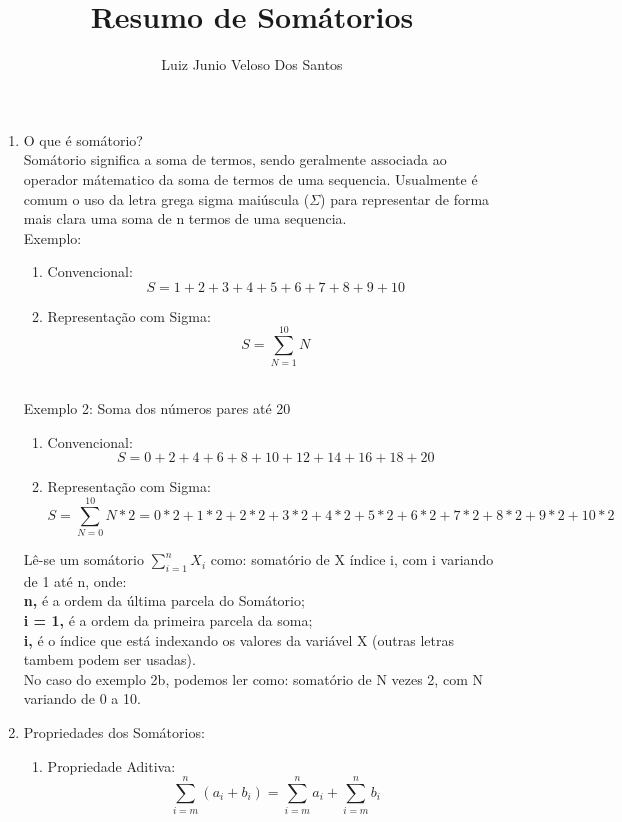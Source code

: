 \documentclass[12pt]{article}
\title{Resumo de Somátorios}
\author{Luiz Junio Veloso Dos Santos}
\begin{document}
 

\maketitle

\begin{enumerate}
    \item O que é somátorio?
    \\
    Somátorio significa a soma de termos, sendo geralmente associada ao operador mátematico da soma de termos
    de uma sequencia. Usualmente é comum o uso da letra grega sigma maiúscula ($\Sigma$) para representar de forma mais clara uma
    soma de n termos de uma sequencia.\\
    Exemplo:
    \begin{enumerate}
        \item Convencional:
            $$S = 1 + 2 + 3 + 4 + 5 + 6 + 7 + 8 + 9 + 10$$
        \item Representação com Sigma:
            $$S = \sum_{N = 1}^{10} N $$
    \end{enumerate}
    ~\\ Exemplo 2: Soma dos números pares até 20
    \begin{enumerate}
        \item Convencional:
            $$ S = 0 + 2 + 4 + 6 + 8 + 10 + 12 + 14 + 16 + 18 + 20 $$
        \item Representação com Sigma:
            $$ 
            S = \sum_{N = 0}^{10} N * 2 = 0*2 + 1*2 + 2*2 + 3*2 + 4*2 + 5*2 + 6*2 + 7*2 + 8*2 + 9*2 + 10*2
            $$
        \end{enumerate}
            Lê-se um somátorio $\sum\limits_{i = 1}^{n} X_i$   como: somatório de X índice i, com i
            variando de 1 até n, onde:\\
            \textbf{n,} é a ordem da última parcela do Somátorio;
            \\
            \textbf{i = 1,} é a ordem da primeira parcela da soma;
            \\
            \textbf{i,} é o índice que está indexando os valores da variável X (outras letras tambem podem
            ser usadas).
            \\
            No caso do exemplo 2b, podemos ler como: somatório de N vezes 2, com N
            variando de 0 a 10.
            \vspace{4mm} 
        \item Propriedades dos Somátorios:
            \begin{enumerate}
                \item Propriedade Aditiva:
                    $$\sum_{i=m}^{n}(a_i + b_i) = \sum_{i=m}^{n} a_i  + \sum_{i=m}^{n} b_i$$
            \end{enumerate}

\end{enumerate}




\end{document}
